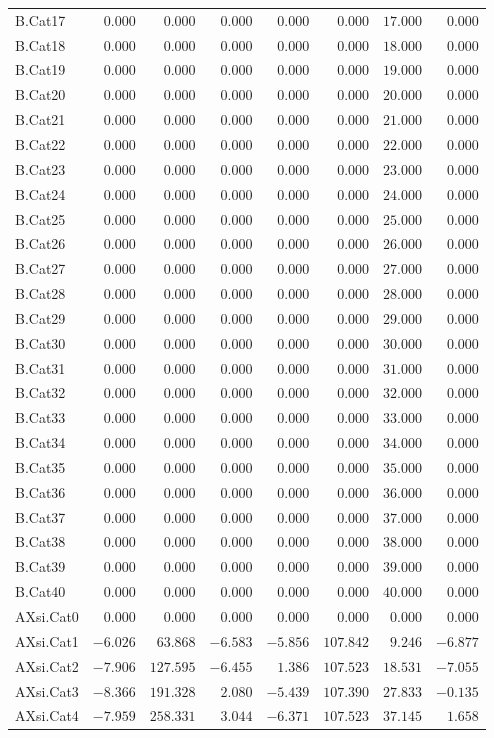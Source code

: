 \documentclass[6pt]{article}
\begin{document}
{\begin{longtable}{lrrrrrrr}
B.Cat17&$ 0.000$&$  0.000$&$ 0.000$&$ 0.000$&$  0.000$&$ 17.000$&$ 0.000$\tabularnewline
B.Cat18&$ 0.000$&$  0.000$&$ 0.000$&$ 0.000$&$  0.000$&$ 18.000$&$ 0.000$\tabularnewline
B.Cat19&$ 0.000$&$  0.000$&$ 0.000$&$ 0.000$&$  0.000$&$ 19.000$&$ 0.000$\tabularnewline
B.Cat20&$ 0.000$&$  0.000$&$ 0.000$&$ 0.000$&$  0.000$&$ 20.000$&$ 0.000$\tabularnewline
B.Cat21&$ 0.000$&$  0.000$&$ 0.000$&$ 0.000$&$  0.000$&$ 21.000$&$ 0.000$\tabularnewline
B.Cat22&$ 0.000$&$  0.000$&$ 0.000$&$ 0.000$&$  0.000$&$ 22.000$&$ 0.000$\tabularnewline
B.Cat23&$ 0.000$&$  0.000$&$ 0.000$&$ 0.000$&$  0.000$&$ 23.000$&$ 0.000$\tabularnewline
B.Cat24&$ 0.000$&$  0.000$&$ 0.000$&$ 0.000$&$  0.000$&$ 24.000$&$ 0.000$\tabularnewline
B.Cat25&$ 0.000$&$  0.000$&$ 0.000$&$ 0.000$&$  0.000$&$ 25.000$&$ 0.000$\tabularnewline
B.Cat26&$ 0.000$&$  0.000$&$ 0.000$&$ 0.000$&$  0.000$&$ 26.000$&$ 0.000$\tabularnewline
B.Cat27&$ 0.000$&$  0.000$&$ 0.000$&$ 0.000$&$  0.000$&$ 27.000$&$ 0.000$\tabularnewline
B.Cat28&$ 0.000$&$  0.000$&$ 0.000$&$ 0.000$&$  0.000$&$ 28.000$&$ 0.000$\tabularnewline
B.Cat29&$ 0.000$&$  0.000$&$ 0.000$&$ 0.000$&$  0.000$&$ 29.000$&$ 0.000$\tabularnewline
B.Cat30&$ 0.000$&$  0.000$&$ 0.000$&$ 0.000$&$  0.000$&$ 30.000$&$ 0.000$\tabularnewline
B.Cat31&$ 0.000$&$  0.000$&$ 0.000$&$ 0.000$&$  0.000$&$ 31.000$&$ 0.000$\tabularnewline
B.Cat32&$ 0.000$&$  0.000$&$ 0.000$&$ 0.000$&$  0.000$&$ 32.000$&$ 0.000$\tabularnewline
B.Cat33&$ 0.000$&$  0.000$&$ 0.000$&$ 0.000$&$  0.000$&$ 33.000$&$ 0.000$\tabularnewline
B.Cat34&$ 0.000$&$  0.000$&$ 0.000$&$ 0.000$&$  0.000$&$ 34.000$&$ 0.000$\tabularnewline
B.Cat35&$ 0.000$&$  0.000$&$ 0.000$&$ 0.000$&$  0.000$&$ 35.000$&$ 0.000$\tabularnewline
B.Cat36&$ 0.000$&$  0.000$&$ 0.000$&$ 0.000$&$  0.000$&$ 36.000$&$ 0.000$\tabularnewline
B.Cat37&$ 0.000$&$  0.000$&$ 0.000$&$ 0.000$&$  0.000$&$ 37.000$&$ 0.000$\tabularnewline
B.Cat38&$ 0.000$&$  0.000$&$ 0.000$&$ 0.000$&$  0.000$&$ 38.000$&$ 0.000$\tabularnewline
\newpage
B.Cat39&$ 0.000$&$  0.000$&$ 0.000$&$ 0.000$&$  0.000$&$ 39.000$&$ 0.000$\tabularnewline
B.Cat40&$ 0.000$&$  0.000$&$ 0.000$&$ 0.000$&$  0.000$&$ 40.000$&$ 0.000$\tabularnewline
AXsi.Cat0&$ 0.000$&$  0.000$&$ 0.000$&$ 0.000$&$  0.000$&$  0.000$&$ 0.000$\tabularnewline
AXsi.Cat1&$-6.026$&$ 63.868$&$-6.583$&$-5.856$&$107.842$&$  9.246$&$-6.877$\tabularnewline
AXsi.Cat2&$-7.906$&$127.595$&$-6.455$&$ 1.386$&$107.523$&$ 18.531$&$-7.055$\tabularnewline
AXsi.Cat3&$-8.366$&$191.328$&$ 2.080$&$-5.439$&$107.390$&$ 27.833$&$-0.135$\tabularnewline
AXsi.Cat4&$-7.959$&$258.331$&$ 3.044$&$-6.371$&$107.523$&$ 37.145$&$ 1.658$\tabularnewline

\end{longtable}}
\end{document}
